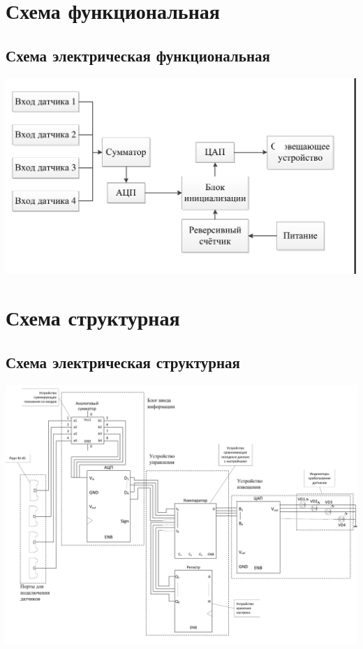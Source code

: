 \chapter{Схема функциональная}
	\section{Схема электрическая функциональная}
	\begin{center}
		\includegraphics[width=180mm]{src/pictures/schemep1.png}
	\end{center}
\chapter{Схема структурная}
	\section{Схема электрическая структурная}
	\begin{center}
		\includegraphics[width=180mm]{src/pictures/schemep2.png}
	\end{center}

